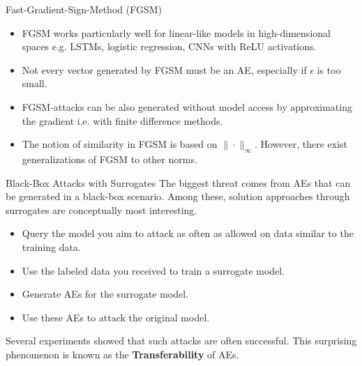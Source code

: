 \documentclass[11pt,compress,t,notes=noshow, xcolor=table]{beamer}
\begin{document}
\begin{vbframe}{Fast-Gradient-Sign-Method (FGSM)}
\begin{itemize}
    \item FGSM works particularly well for linear-like models in high-dimensional spaces e.g. LSTMs, logistic regression, CNNs with ReLU activations.
    \item Not every vector generated by FGSM must be an AE, especially if $\epsilon$ is too small.
    \item FGSM-attacks can be also generated without model access by approximating the gradient i.e. with finite difference methods.
    \item The notion of similarity in FGSM is based on $\|\cdot\|_{\infty}$. However, there exist generalizations of FGSM to other norms.
\end{itemize}
\end{vbframe}


\begin{vbframe}{Black-Box Attacks with Surrogates}
The biggest threat comes from AEs that can be generated in a black-box scenario. Among these, solution approaches through surrogates are conceptually most interesting.
\begin{itemize}
    \item Query the model you aim to attack as often as allowed on data similar to the training data.
    \item Use the labeled data you received to train a surrogate model.%
    \item %
    Generate AEs for the surrogate model.%
    \item Use these AEs to attack the original model.
\end{itemize}
Several experiments showed that such attacks are often successful.%
This surprising phenomenon is known as the \textbf{Transferability} of AEs.
%
%
\end{vbframe}
\end{document}
